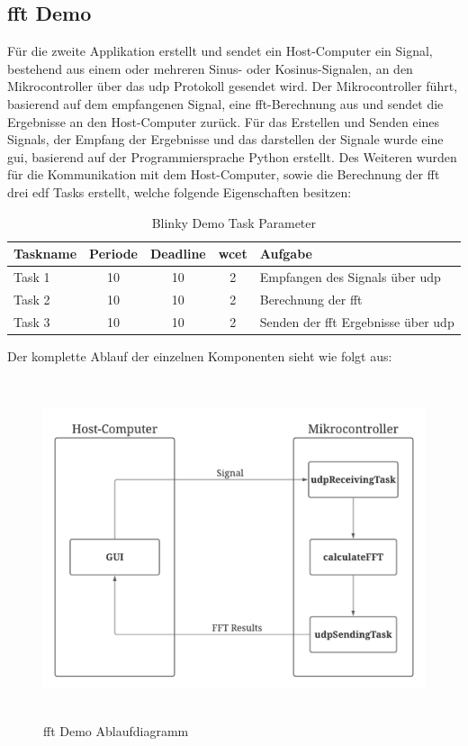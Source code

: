 \documentclass[../EDF Master Thesis.tex]{subfiles}
\begin{document}
    \subsection{\ac{fft} Demo} \label{section:fft_demo}

        Für die zweite Applikation erstellt und sendet ein Host-Computer ein Signal, bestehend aus einem oder mehreren Sinus- oder Kosinus-Signalen, an den Mikrocontroller über das \ac{udp} Protokoll gesendet wird.
        Der Mikrocontroller führt, basierend auf dem empfangenen Signal, eine \ac{fft}-Berechnung aus und sendet die Ergebnisse an den Host-Computer zurück.
        Für das Erstellen und Senden eines Signals, der Empfang der Ergebnisse und das darstellen der Signale wurde eine \ac{gui}, basierend auf der Programmiersprache Python erstellt.
        Des Weiteren wurden für die Kommunikation mit dem Host-Computer, sowie die Berechnung der \ac{fft} drei \ac{edf} Tasks erstellt, welche folgende Eigenschaften besitzen:

        \begin{table}[ht!]
            \centering
            \begin{tabular}{l|c|c|c|l}
                Taskname & Periode & Deadline & \ac{wcet} & Aufgabe \\
                \hline
                Task 1 & 10 & 10 & 2 & Empfangen des Signals über \ac{udp}\\
                Task 2 & 10 & 10 & 2 & Berechnung der \ac{fft}\\
                Task 3 & 10 & 10 & 2 & Senden der \ac{fft} Ergebnisse über \ac{udp}
            \end{tabular}
            \caption{Blinky Demo Task Parameter}
            \label{table:blinky_demo_task_parameter}
        \end{table}

        Der komplette Ablauf der einzelnen Komponenten sieht wie folgt aus:

        \begin{figure}[H]
            \centering
            \includegraphics[height=10cm, width=14cm]{./attachments/FFT Ablauf.pdf}
            \caption{\ac{fft} Demo Ablaufdiagramm}
            \label{fig:fft_demo_ablaufdiagramm}
        \end{figure}
\end{document}
